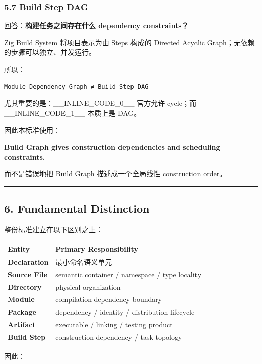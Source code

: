 \documentclass[11pt,a4paper]{article}
\begin{document}
\subsubsection{5.7 Build Step DAG}
回答：\textbf{构建任务之间存在什么 dependency constraints？}

Zig Build System 将项目表示为由 Steps 构成的 Directed Acyclic Graph；无依赖的步骤可以独立、并发运行。

所以：

\begin{lstlisting}[language=text]
Module Dependency Graph ≠ Build Step DAG
\end{lstlisting}
尤其重要的是：\_\_INLINE\_CODE\_0\_\_ 官方允许 cycle；而 \_\_INLINE\_CODE\_1\_\_ 本质上是 DAG。

因此本标准使用：

\begin{gfmBlockquote}
\textbf{Build Graph gives construction dependencies and scheduling constraints.}
\end{gfmBlockquote}
而不是错误地把 Build Graph 描述成一个全局线性 construction order。

\vspace{0.5em}\hrule\vspace{0.5em}
\subsection{6. Fundamental Distinction}
整份标准建立在以下区别之上：

\begin{table}[htbp]
\centering
\small
\begin{tabularx}{\textwidth}{| X | X |}
\hline
\rowcolor{codebg}
\textbf{Entity} & \textbf{Primary Responsibility} \\ \hline
\textbf{Declaration} & 最小命名语义单元 \\ \hline
\rowcolor{codebg!50} \textbf{Source File} & semantic container / namespace / type locality \\ \hline
\textbf{Directory} & physical organization \\ \hline
\rowcolor{codebg!50} \textbf{Module} & compilation dependency boundary \\ \hline
\textbf{Package} & dependency / identity / distribution lifecycle \\ \hline
\rowcolor{codebg!50} \textbf{Artifact} & executable / linking / testing product \\ \hline
\textbf{Build Step} & construction dependency / task topology \\ \hline
\end{tabularx}
\end{table}
因此：
\end{document}
